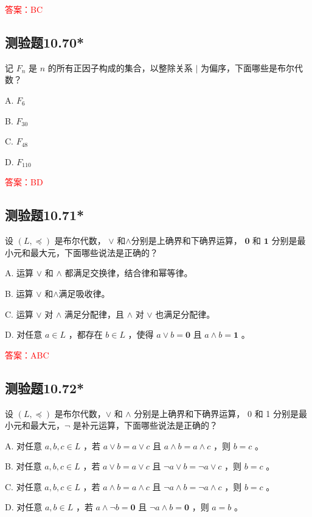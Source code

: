 \documentclass[UTF8, heading=true]{ctexart}
\begin{document}
\textcolor{red}{答案：BC}

\subsection{测验题10.70*}

记 $F_n$ 是 $n$ 的所有正因子构成的集合，以整除关系 $\mid$ 为偏序，下面哪些是布尔代数？

A. $ F_6$

B. $ F_{30}$

C. $F_{48}$

D. $ F_{110}$

\textcolor{red}{答案：BD}

\subsection{测验题10.71*}

设 $(L, \preceq)$ 是布尔代数， $\vee$ 和$\wedge$分别是上确界和下确界运算， $\mathbf{0}$ 和 $\mathbf{1}$ 分别是最小元和最大元，下面哪些说法是正确的？

A. 运算 $\vee$ 和 $\wedge$ 都满足交换律，结合律和幂等律。

B. 运算 $\vee$ 和$\wedge$满足吸收律。

C. 运算 $\vee$ 对 $\wedge$ 满足分配律，且 $\wedge$ 对 $\vee$ 也满足分配律。

D. 对任意 $a \in L$ ，都存在 $b \in L$ ，使得 $a \vee b=\mathbf{0}$ 且 $a \wedge b=\mathbf{1}$ 。

\textcolor{red}{答案：ABC}

\subsection{测验题10.72*}

设 $(L, \preceq)$ 是布尔代数，$\vee$ 和 $\wedge$ 分别是上确界和下确界运算， 0 和 1 分别是最小元和最大元，$\neg$ 是补元运算，下面哪些说法是正确的？

A. 对任意 $a, b, c \in L$ ，若 $a \vee b=a \vee c$ 且 $a \wedge b=a \wedge c$ ，则 $b=c$ 。

B. 对任意 $a, b, c \in L$ ，若 $a \vee b=a \vee c$ 且 $\neg a \vee b=\neg a \vee c$ ，则 $b=c$ 。

C. 对任意 $a, b, c \in L$ ，若 $a \wedge b=a \wedge c$ 且 $\neg a \wedge b=\neg a \wedge c$ ，则 $b=c$ 。

D. 对任意 $a, b \in L$ ，若 $a \wedge \neg b=\mathbf{0}$ 且 $\neg a \wedge b=\mathbf{0}$ ，则 $a=b$ 。
\end{document}
